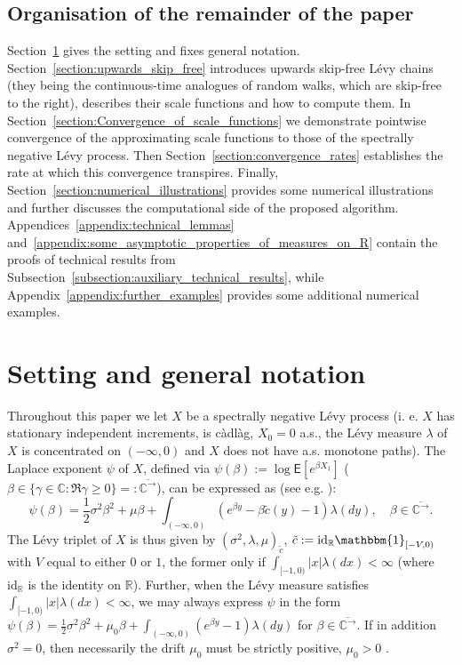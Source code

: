 \documentclass[pdftex,oneside,11pt,reqno]{amsart}
\theoremstyle{definition}
\theoremstyle{theorem}
\theoremstyle{remark}
\numberwithin{equation}{section}
\numberwithin{definition}{section}
\begin{document}
\subsection{Organisation of the remainder of the paper}
Section~\ref{section:setting_and_notation} gives the setting and fixes general notation. Section~\ref{section:upwards_skip_free} introduces upwards skip-free L\'evy chains (they being the continuous-time analogues of random walks, which are skip-free to the right), describes their scale functions and how to compute them. In Section~\ref{section:Convergence_of_scale_functions} we demonstrate pointwise convergence of the approximating scale functions to those of the spectrally negative L\'evy process. Then Section~\ref{section:convergence_rates} establishes the rate at which this convergence transpires. Finally, Section~\ref{section:numerical_illustrations} provides some numerical illustrations and further discusses the computational side of the proposed algorithm. Appendices~\ref{appendix:technical_lemmas} and~\ref{appendix:some_asymptotic_properties_of_measures_on_R} contain the proofs of technical results from Subsection~\ref{subsection:auxiliary_technical_results}, while Appendix~\ref{appendix:further_examples} provides some additional numerical examples. 

\section{Setting and general notation}\label{section:setting_and_notation}
Throughout this paper we let $X$ be a spectrally negative L\'evy process (i. e. $X$ has stationary independent increments, is c\`adl\`ag, $X_0=0$ a.s., the L\'evy measure ${\lambda}$ of $X$ is concentrated on $(-\infty,0)$ and $X$ does not have a.s. monotone paths). The Laplace exponent $\psi$ of $X$, defined via $\psi(\beta):=\log {\mathsf E}[e^{\beta X_1}]$ ($\beta\in\{\gamma\in \mathbb{C}:\Re\gamma\geq 0\}=:{\overline{\mathbb{C}^{\rightarrow}}}$), can be expressed as (see e.g. \cite[p. 188]{bertoin}):
\begin{equation}\label{eq:laplace_exponent}
\psi(\beta)=\frac{1}{2}{\sigma^2}\beta^2+{\mu} \beta+\int_{(-\infty,0)}\left(e^{\beta y}-\beta \tilde{c}(y)-1\right){\lambda}(dy),\quad \beta\in {\overline{\mathbb{C}^{\rightarrow}}}.
\end{equation}
The L\'evy triplet of $X$ is thus given by $({\sigma^2},{\lambda},\mu)_{\tilde{c}}$, $\tilde{c}:=\mathrm{id}_\mathbb{R}\mathbbm{1}_{[-V,0)}$ with $V$ equal to either $0$ or $1$, the former only if $\int_{[-1,0)}\vert x\vert{\lambda}(dx)<\infty$ (where $\mathrm{id}_\mathbb{R}$ is the identity on $\mathbb{R}$). Further, when the L\'evy measure satisfies $\int_{[-1,0)}\vert x\vert{\lambda}(dx)<\infty$, we may always express $\psi$ in the form $\psi(\beta)=\frac{1}{2}{\sigma^2}\beta^2+{\mu}_0 \beta+\int_{(-\infty,0)}\left(e^{\beta y}-1\right){\lambda}(dy)$ for $\beta\in{\overline{\mathbb{C}^{\rightarrow}}}$. If in addition ${\sigma^2}=0$, then necessarily the drift $\mu_0$ must be strictly positive, $\mu_0>0$ \cite[p. 212]{kyprianou}. 
\end{document}
